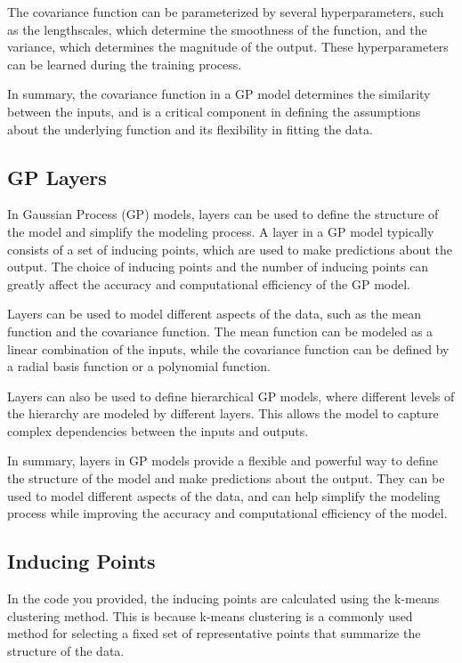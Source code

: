\documentclass[12pt,a4paper]{report}
\begin{document}
The covariance function can be parameterized by several hyperparameters, such as the lengthscales, which determine the smoothness of the function, and the variance, which determines the magnitude of the output. These hyperparameters can be learned during the training process.

In summary, the covariance function in a GP model determines the similarity between the inputs, and is a critical component in defining the assumptions about the underlying function and its flexibility in fitting the data.

\subsection{GP Layers}

In Gaussian Process (GP) models, layers can be used to define the structure of the model and simplify the modeling process. A layer in a GP model typically consists of a set of inducing points, which are used to make predictions about the output. The choice of inducing points and the number of inducing points can greatly affect the accuracy and computational efficiency of the GP model.

Layers can be used to model different aspects of the data, such as the mean function and the covariance function. The mean function can be modeled as a linear combination of the inputs, while the covariance function can be defined by a radial basis function or a polynomial function.

Layers can also be used to define hierarchical GP models, where different levels of the hierarchy are modeled by different layers. This allows the model to capture complex dependencies between the inputs and outputs.

In summary, layers in GP models provide a flexible and powerful way to define the structure of the model and make predictions about the output. They can be used to model different aspects of the data, and can help simplify the modeling process while improving the accuracy and computational efficiency of the model.

\subsection{Inducing Points}

In the code you provided, the inducing points are calculated using the k-means clustering method. This is because k-means clustering is a commonly used method for selecting a fixed set of representative points that summarize the structure of the data.
\end{document}
